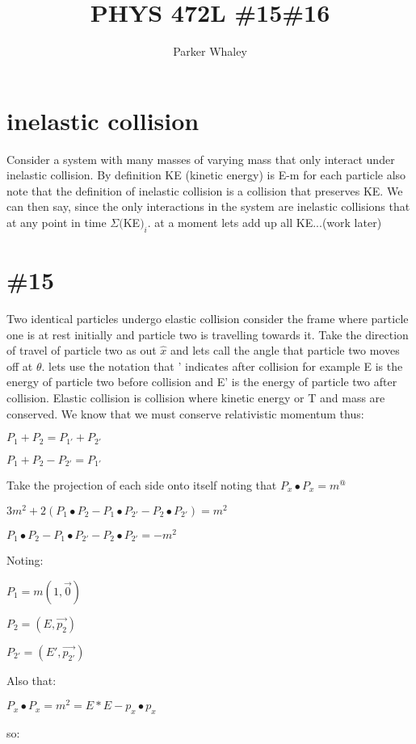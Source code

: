 \documentclass[10pt,a4paper]{article}
\author{Parker Whaley}
\title{PHYS 472L \#15\#16}
\begin{document}
\maketitle

\section{inelastic collision}
Consider a system with many masses of varying mass that only interact under inelastic collision.  By definition KE (kinetic energy) is E-m for each particle also note that the definition of inelastic collision is a collision that preserves KE.  We can then say, since the only interactions in the system are inelastic collisions that at any point in time \(\Sigma (\)KE\()_{i}\).  at a moment lets add up all KE...(work later)

\section{\#15}
Two identical particles undergo elastic collision consider the frame where particle one is at rest initially and particle two is travelling towards it.  Take the direction of travel of particle two as out \(\hat{x}\) and lets call the angle that particle two moves off at \(\theta\).  lets use the notation that ' indicates after collision for example E is the energy of particle two before collision and E' is the energy of particle two after collision.  Elastic collision is collision where kinetic energy or T and mass are conserved.  We know that we must conserve relativistic momentum thus: 

\(P_{1}+P_{2}=P_{1'}+P_{2'}\) 

\(P_{1}+P_{2}-P_{2'}=P_{1'}\)

Take the projection of each side onto itself noting that \(P_{x}\bullet P_{x}=m^@\)

\(3m^{2}+2(P_{1}\bullet P_{2}-P_{1}\bullet P_{2'}-P_{2}\bullet P_{2'})=m^2\)

\(P_{1}\bullet P_{2}-P_{1}\bullet P_{2'}-P_{2}\bullet P_{2'}=-m^2\)

Noting:

\(P_{1}=m(1,\vec{0})\)

\(P_{2}=(E,\vec{p_{2}})\)

\(P_{2'}=(E',\vec{p_{2'}})\)

Also that:

\(P_{x}\bullet P_{x}=m^{2}=E*E-p_{x}\bullet p_{x}\)

so:
\end{document}
